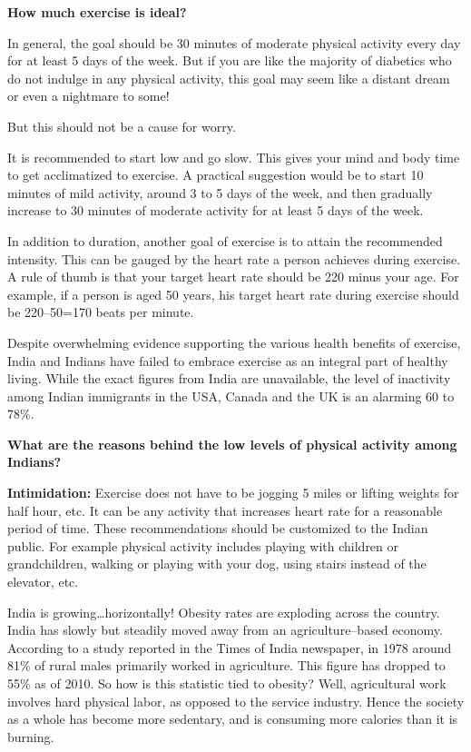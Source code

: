 \textbf{How much exercise is ideal?}

In general, the goal should be 30 minutes of moderate physical activity every day for at least 5 days of the week. But if you are like the majority of diabetics who do not indulge in any physical activity, this goal may seem like a distant dream or even a nightmare to some!

But this should not be a cause for worry.

It is recommended to start low and go slow. This gives your mind and body time to get acclimatized to exercise. A practical suggestion would be to start 10 minutes of mild activity, around 3 to 5 days of the week, and then gradually increase to 30 minutes of moderate activity for at least 5 days of the week.

In addition to duration, another goal of exercise is to attain the recommended intensity. This can be gauged by the heart rate a person achieves during exercise. A rule of thumb is that your target heart rate should be 220 minus your age. For example, if a person is aged 50 years, his target heart rate during exercise should be 220–50=170 beats per minute.


Despite overwhelming evidence supporting the various health benefits of exercise, India and Indians have failed to embrace exercise as an integral part of healthy living. While the exact figures from India are unavailable, the level of inactivity among Indian immigrants in the USA, Canada and the UK is an alarming 60 to 78\%.

\textbf{What are the reasons behind the low levels of physical activity among Indians?}

\textbf{Intimidation:} Exercise does not have to be jogging 5 miles or lifting weights for half hour, etc. It can be any activity that increases heart rate for a reasonable period of time. These recommendations should be customized to the Indian public. For example physical activity includes playing with children or grandchildren, walking or playing with your dog, using stairs instead of the elevator, etc.

India is growing…horizontally! Obesity rates are exploding across the country. India has slowly but steadily moved away from an agriculture–based economy. According to a study reported in the Times of India newspaper, in 1978 around 81\% of rural males primarily worked in agriculture. This figure has dropped to 55\% as of 2010. So how is this statistic tied to obesity? Well, agricultural work involves hard physical labor, as opposed to the service industry. Hence the society as a whole has become more sedentary, and is consuming more calories than it is burning.

